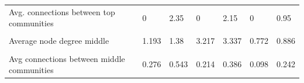 \documentclass[
]{article}
\begin{document}
\begin{table}
\begin{tabular}[t]{>{\raggedright\arraybackslash}p{8em}llllll}
Avg. connections between top communities & 0 & 2.35 & 0 & 2.15 & 0 & 0.95\\
\cellcolor{gray!6}{Modularity (middle)} & \cellcolor{gray!6}{0.771} & \cellcolor{gray!6}{0.658} & \cellcolor{gray!6}{0.875} & \cellcolor{gray!6}{0.841} & \cellcolor{gray!6}{0.813} & \cellcolor{gray!6}{0.697}\\
Average node degree middle & 1.193 & 1.38 & 3.217 & 3.337 & 0.772 & 0.886\\
\cellcolor{gray!6}{Avg connections within middle communities} & \cellcolor{gray!6}{20} & \cellcolor{gray!6}{20} & \cellcolor{gray!6}{61.333} & \cellcolor{gray!6}{61.333} & \cellcolor{gray!6}{9.667} & \cellcolor{gray!6}{9.667}\\
\addlinespace
Avg connections between middle communities & 0.276 & 0.543 & 0.214 & 0.386 & 0.098 & 0.242\\
\bottomrule
\end{tabular}
\end{table}

\clearpage
\newpage
\end{document}
